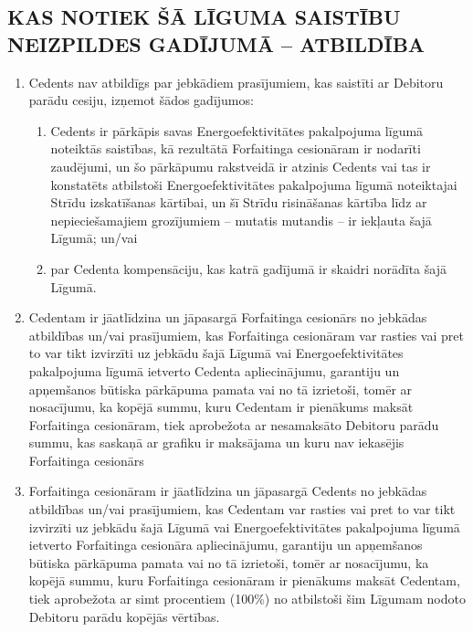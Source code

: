 \documentclass[a4paper]{article}
\begin{document}
\begin{multicols}{2}
  \subsection{KAS NOTIEK ŠĀ LĪGUMA SAISTĪBU NEIZPILDES
GADĪJUMĀ – ATBILDĪBA}

  \begin{enumerate}
  \item{Cedents nav atbildīgs par jebkādiem prasījumiem, kas saistīti ar
Debitoru parādu cesiju, izņemot šādos gadījumos:}
    \begin{enumerate}
    \item{Cedents ir pārkāpis savas Energoefektivitātes pakalpojuma
līgumā noteiktās saistības, kā rezultātā Forfaitinga cesionāram ir
nodarīti zaudējumi, un šo pārkāpumu rakstveidā ir atzinis Cedents vai
tas ir konstatēts atbilstoši Energoefektivitātes pakalpojuma līgumā
noteiktajai Strīdu izskatīšanas kārtībai, un šī Strīdu risināšanas kārtība
līdz ar nepieciešamajiem grozījumiem – mutatis mutandis – ir iekļauta
šajā Līgumā; un/vai}

    \item{par Cedenta kompensāciju, kas katrā gadījumā ir skaidri
norādīta šajā Līgumā.}
    \end{enumerate}

  \item{Cedentam ir jāatlīdzina un jāpasargā Forfaitinga cesionārs no jebkādas
atbildības un/vai prasījumiem, kas Forfaitinga cesionāram var rasties
vai pret to var tikt izvirzīti uz jebkādu šajā Līgumā vai
Energoefektivitātes pakalpojuma līgumā ietverto Cedenta
apliecinājumu, garantiju un apņemšanos būtiska pārkāpuma pamata
vai no tā izrietoši, tomēr ar nosacījumu, ka kopējā summu, kuru
Cedentam ir pienākums maksāt Forfaitinga cesionāram, tiek
aprobežota ar nesamaksāto Debitoru parādu summu, kas saskaņā ar
grafiku ir maksājama un kuru nav iekasējis Forfaitinga cesionārs}

  \item{Forfaitinga cesionāram ir jāatlīdzina un jāpasargā Cedents no jebkādas
atbildības un/vai prasījumiem, kas Cedentam var rasties vai pret to var
tikt izvirzīti uz jebkādu šajā Līgumā vai Energoefektivitātes pakalpojuma
līgumā ietverto Forfaitinga cesionāra apliecinājumu, garantiju un
apņemšanos būtiska pārkāpuma pamata vai no tā izrietoši, tomēr ar
nosacījumu, ka kopējā summu, kuru Forfaitinga cesionāram ir
pienākums maksāt Cedentam, tiek aprobežota ar simt procentiem
(100\%) no atbilstoši šim Līgumam nodoto Debitoru parādu kopējās
vērtības.}


\end{enumerate}
\end{multicols}
\end{document}
